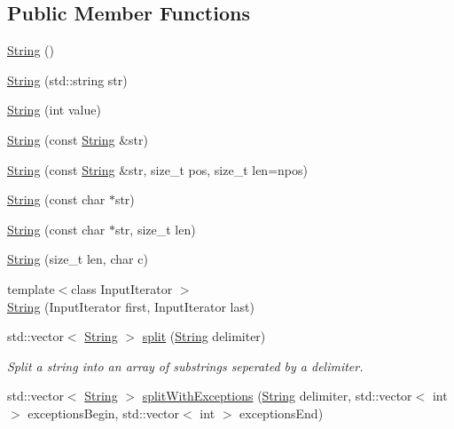 \subsection*{Public Member Functions}
\begin{DoxyCompactItemize}
\item 
\hyperlink{class_rad_j_a_v_1_1_string_a985090598133e2119dce64b79b176250}{String} ()
\item 
\hyperlink{class_rad_j_a_v_1_1_string_ab80c5e67a1b9c5bd24e75abfa0c8c77e}{String} (std\+::string str)
\item 
\hyperlink{class_rad_j_a_v_1_1_string_ac73be9671464715f5f461b242896ee0e}{String} (int value)
\item 
\hyperlink{class_rad_j_a_v_1_1_string_abdf12af39be1b08362731678b1edbf9c}{String} (const \hyperlink{class_rad_j_a_v_1_1_string}{String} \&str)
\item 
\hyperlink{class_rad_j_a_v_1_1_string_ab223546fa6dfdb4d6d5b80e846ab9642}{String} (const \hyperlink{class_rad_j_a_v_1_1_string}{String} \&str, size\+\_\+t pos, size\+\_\+t len=npos)
\item 
\hyperlink{class_rad_j_a_v_1_1_string_a56172a9c1c2e45232ed90cb4e79a9875}{String} (const char $\ast$str)
\item 
\hyperlink{class_rad_j_a_v_1_1_string_a71f9c004439cc655fe780c437d45c3d3}{String} (const char $\ast$str, size\+\_\+t len)
\item 
\hyperlink{class_rad_j_a_v_1_1_string_a37ca615c93d4853a3f6840fc3e29624e}{String} (size\+\_\+t len, char c)
\item 
{\footnotesize template$<$class Input\+Iterator $>$ }\\\hyperlink{class_rad_j_a_v_1_1_string_a028d4f2e378a4e60468e974cc7c1e81d}{String} (Input\+Iterator first, Input\+Iterator last)
\item 
std\+::vector$<$ \hyperlink{class_rad_j_a_v_1_1_string}{String} $>$ \hyperlink{class_rad_j_a_v_1_1_string_ad5550975cd1e484edf996381407a21e9}{split} (\hyperlink{class_rad_j_a_v_1_1_string}{String} delimiter)
\begin{DoxyCompactList}\small\item\em Split a string into an array of substrings seperated by a delimiter. \end{DoxyCompactList}\item 
std\+::vector$<$ \hyperlink{class_rad_j_a_v_1_1_string}{String} $>$ \hyperlink{class_rad_j_a_v_1_1_string_a7b5314ad977b2ab1c2d9452ed3103975}{split\+With\+Exceptions} (\hyperlink{class_rad_j_a_v_1_1_string}{String} delimiter, std\+::vector$<$ int $>$ exceptions\+Begin, std\+::vector$<$ int $>$ exceptions\+End)

\end{DoxyCompactItemize}
